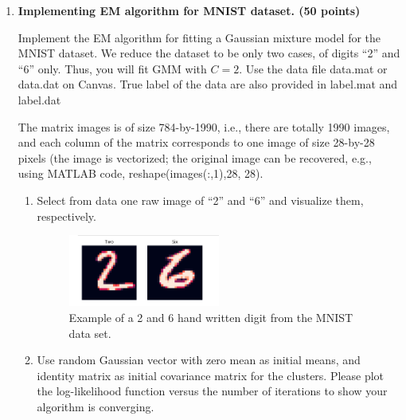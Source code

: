 \documentclass[twoside,10pt]{article}
\begin{document}
\begin{enumerate}
\begin{enumerate}
 
 
 \end{enumerate}



\item {\bf Implementing EM algorithm for MNIST dataset. (50 points)} 

 Implement the EM algorithm for fitting a Gaussian mixture model for the MNIST dataset. We reduce the dataset to be only two cases, of digits ``2'' and ``6'' only. Thus, you will fit GMM with $C = 2$. Use the data file \textsf{data.mat} or \textsf{data.dat} on Canvas. True label of the data are also provided in \textsf{label.mat} and \textsf{label.dat}

The matrix \textsf{images} is of size 784-by-1990, i.e., there are totally 1990 images, and each column of the matrix corresponds to one image of size 28-by-28 pixels (the image is vectorized; the original image can be recovered, e.g., using MATLAB code, \textsf{reshape(images(:,1),28, 28)}.


\begin{enumerate}

\item Select from data one raw image of ``2'' and ``6'' and visualize them, respectively. 

 \begin{figure}[h]
\caption{Example of a 2 and 6 hand written digit from the MNIST data set.  }
\centering
\includegraphics[width=0.5\textwidth]{2_a.png}
\end{figure}

\item Use random Gaussian vector with zero mean as initial means, and identity matrix as initial covariance matrix for the clusters. Please plot the log-likelihood function versus the number of iterations to show your algorithm is converging.



\end{enumerate}
\end{enumerate}
\end{document}
